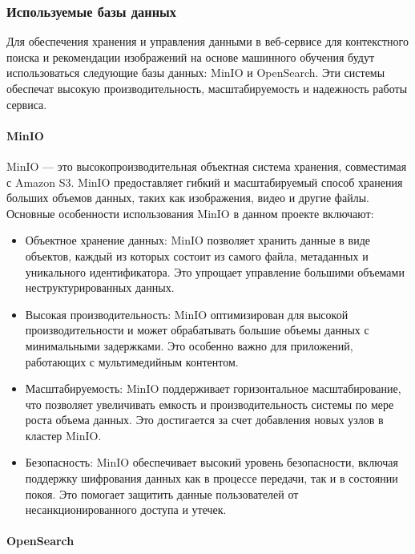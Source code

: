 \subsubsection{Используемые базы данных}

Для обеспечения хранения и управления данными в веб-сервисе для контекстного поиска и рекомендации изображений на основе машинного обучения будут использоваться следующие базы данных: MinIO и OpenSearch. Эти системы обеспечат высокую производительность, масштабируемость и надежность работы сервиса.

\paragraph{MinIO}

MinIO — это высокопроизводительная объектная система хранения, совместимая с Amazon S3. MinIO предоставляет гибкий и масштабируемый способ хранения больших объемов данных, таких как изображения, видео и другие файлы. Основные особенности использования MinIO в данном проекте включают:

\begin{itemize}
	\item Объектное хранение данных: MinIO позволяет хранить данные в виде объектов, каждый из которых состоит из самого файла, метаданных и уникального идентификатора. Это упрощает управление большими объемами неструктурированных данных.
	\item Высокая производительность: MinIO оптимизирован для высокой производительности и может обрабатывать большие объемы данных с минимальными задержками. Это особенно важно для приложений, работающих с мультимедийным контентом.
	\item Масштабируемость: MinIO поддерживает горизонтальное масштабирование, что позволяет увеличивать емкость и производительность системы по мере роста объема данных. Это достигается за счет добавления новых узлов в кластер MinIO.
	\item Безопасность: MinIO обеспечивает высокий уровень безопасности, включая поддержку шифрования данных как в процессе передачи, так и в состоянии покоя. Это помогает защитить данные пользователей от несанкционированного доступа и утечек.
\end{itemize}

\paragraph{OpenSearch}

